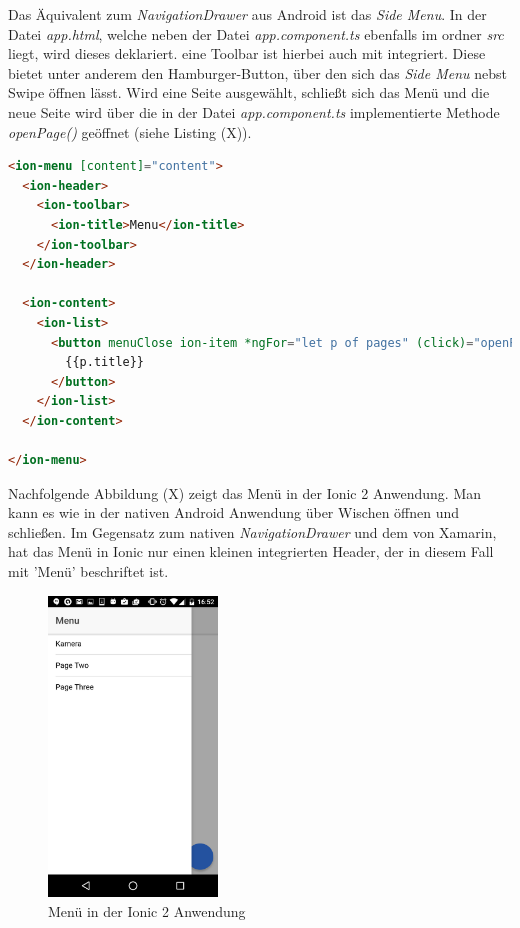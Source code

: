 Das Äquivalent zum \textit{NavigationDrawer} aus Android ist das \textit{Side Menu}. In der Datei \textit{app.html}, welche neben der Datei \textit{app.component.ts} ebenfalls im ordner \textit{src} liegt, wird dieses deklariert. eine Toolbar ist hierbei auch mit integriert. Diese bietet unter anderem den Hamburger-Button, über den sich das \textit{Side Menu} nebst Swipe öffnen lässt. Wird eine Seite ausgewählt, schließt sich das Menü und die neue Seite wird über die in der Datei \textit{app.component.ts} implementierte Methode \textit{openPage()} geöffnet (siehe Listing (X)).

\begin{lstlisting}[caption=Deklaration des \textit{Side Menus} in der Datei \textit{app.html}, label=lst:DeklarationSideMenu, language=html]
<ion-menu [content]="content">
  <ion-header>
    <ion-toolbar>
      <ion-title>Menu</ion-title>
    </ion-toolbar>
  </ion-header>

  <ion-content>
    <ion-list>
      <button menuClose ion-item *ngFor="let p of pages" (click)="openPage(p)">
        {{p.title}}
      </button>
    </ion-list>
  </ion-content>

</ion-menu>
\end{lstlisting}

Nachfolgende Abbildung (X) zeigt das Menü in der Ionic 2 Anwendung. Man kann es wie in der nativen Android Anwendung über Wischen öffnen und schließen. Im Gegensatz zum nativen \textit{NavigationDrawer} und dem von Xamarin, hat das Menü in Ionic nur einen kleinen integrierten Header, der in diesem Fall mit 'Menü' beschriftet ist. 

\begin{figure}[h]
	\centering
	\includegraphics[width=0.4\textwidth]{Bilder/Screenshot_20170328-165235.PNG}
	\caption{Menü in der Ionic 2 Anwendung}
	\label{fig:MenuXamarin}
\end{figure} 

